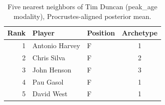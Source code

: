 \begin{table}[htbp]
  \centering\small
  \begin{tabular}{rllc}
    \toprule
    Rank & Player & Position & Archetype \\
    \midrule
    1 & Antonio Harvey & F & 1 \\
    2 & Chris Silva & F & 2 \\
    3 & John Henson & F & 3 \\
    4 & Pau Gasol & F & 1 \\
    5 & David West & F & 1 \\
    \bottomrule
  \end{tabular}
  \caption{Five nearest neighbors of Tim Duncan (peak_age modality), Procrustes-aligned posterior mean.}
  \label{tab:Tim_Duncan_neighbors_peak_age}
\end{table}

